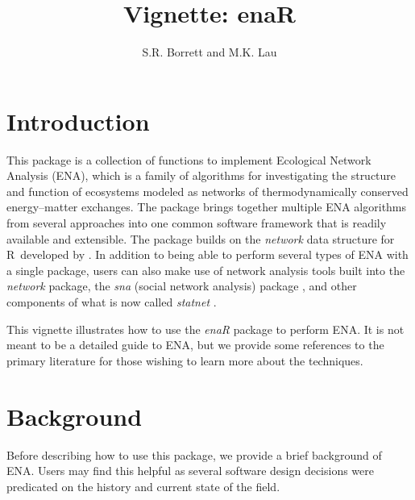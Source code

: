\documentclass[11pt]{article}
\title{Vignette: enaR}
\author{S.R. Borrett and M.K. Lau}
\def\R{\textsf{R}}
\begin{document}
\maketitle

\setcounter{tocdepth}{3}  %
\tableofcontents

\section{Introduction}
This package is a collection of functions to implement Ecological
Network Analysis (ENA), which is a family of algorithms for
investigating the structure and function of ecosystems modeled as
networks of thermodynamically conserved energy--matter exchanges.  The
package brings together multiple ENA algorithms from several
approaches into one common software framework that is readily available and
extensible.  The package builds on the \textit{network} data structure
for \R\ developed by \citet{butts08_network}. In addition to being
able to perform several types of ENA with a single package, users can
also make use of network analysis tools built into the
\textit{network} package, the \textit{sna} (social network analysis)
package \citep{butts08_social}, and other components of what is now
called \textit{statnet} \citep{handcock2008statnet}.

This vignette illustrates how to use the \textit{enaR} package to
perform ENA.  It is not meant to be a detailed guide to ENA, but we
provide some references to the primary literature for those wishing to
learn more about the techniques.

\section{Background}
Before describing how to use this package, we provide a brief
background of ENA.  Users may find this helpful as several software
design decisions were predicated on the history and current state of
the field.
\end{document}
